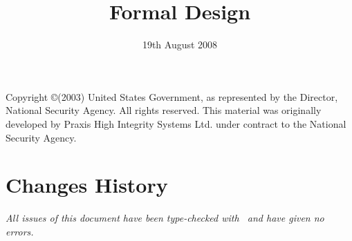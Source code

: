\documentclass{pxcsdoc}
\title{Formal Design}
\date{19th August 2008}
\begin{document}
\maketitle
%


\documentcontrol
Copyright \copyright (2003) United States Government, as represented by the
Director, National Security Agency. All rights reserved.
This material was originally developed by Praxis High Integrity
Systems Ltd. under contract to the National Security Agency.
\section*{Changes History}
\textit{All issues of this document have been type-checked with \fuzz~and have
  given no errors.}
\end{document}
